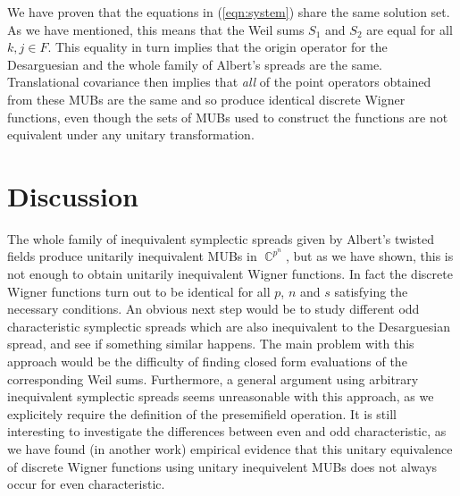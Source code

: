 \documentclass[a4paper, 11pt]{article}
\DeclareMathOperator{\C}{\mathbb{C}}
\begin{document}
  We have proven that the equations in (\ref{eqn:system})
  share the same solution set. As we have mentioned, this
  means that the Weil sums $S_1$ and $S_2$ are equal for all
  $k,j \in F$.  This equality in turn implies that the
  origin operator for the Desarguesian and the whole family
  of Albert's spreads are the same.  Translational
  covariance then implies that \textit{all} of the point
  operators obtained from these MUBs are the same and so
  produce identical discrete Wigner functions, even though
  the sets of MUBs used to construct the functions are not
  equivalent under any unitary transformation.

  \section{Discussion}

  The whole family of inequivalent symplectic spreads
  given by Albert's twisted fields produce unitarily
  inequivalent MUBs in $\C^{p^{n}}$, but as we have shown,
  this is not enough to obtain unitarily inequivalent Wigner
  functions. In fact the discrete Wigner functions turn out
  to be identical for all $p$, $n$ and $s$ satisfying the
  necessary conditions. An obvious next step would be to
  study different odd characteristic symplectic spreads
  which are also inequivalent to the Desarguesian spread,
  and see if something similar happens. The main problem
  with this approach would be the difficulty of finding
  closed form evaluations of the corresponding Weil sums.
  Furthermore, a general argument using arbitrary
  inequivalent symplectic spreads seems unreasonable with
  this approach, as we explicitely require the definition of
  the presemifield operation. It is still interesting to
  investigate the differences between even and odd
  characteristic, as we have found (in another work)
  empirical evidence that this unitary equivalence of
  discrete Wigner functions using unitary inequivelent MUBs
  does not always occur for even characteristic.

  \printbibliography

\end{document}
